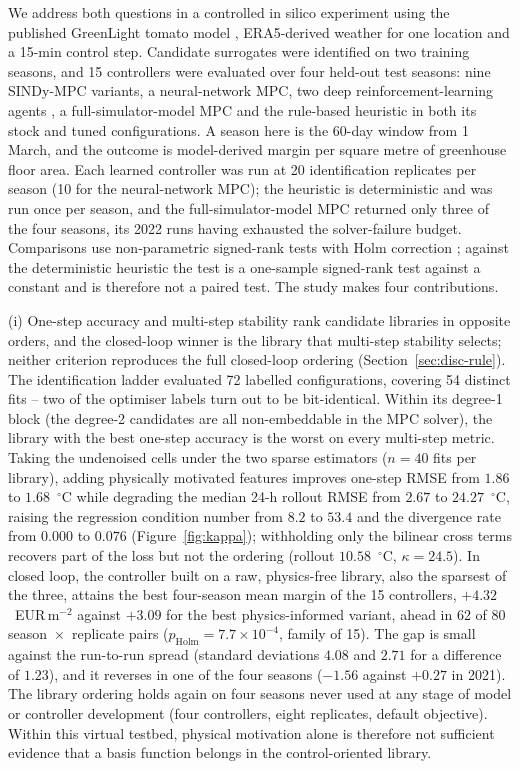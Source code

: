 We address both questions in a controlled in silico experiment using the published
GreenLight tomato model \cite{katzin2020,vanlaatum2025}, ERA5-derived weather for one
location and a 15-min control step. Candidate surrogates were identified on two training
seasons, and 15 controllers were evaluated over four held-out test seasons: nine
SINDy-MPC variants, a neural-network MPC, two deep reinforcement-learning agents
\cite{schulman2017,haarnoja2018,raffin2021}, a full-simulator-model MPC and the
rule-based heuristic in both its stock and tuned configurations. A season
here is the 60-day window from 1 March, and the outcome is model-derived margin per square
metre of greenhouse floor area. Each learned controller was run at 20 identification
replicates per season (10 for
the neural-network MPC); the heuristic is deterministic and was run once per season, and
the full-simulator-model MPC returned only three of the four seasons, its 2022 runs having
exhausted the solver-failure budget. Comparisons use non-parametric signed-rank tests with
Holm correction \cite{wilcoxon1945,holm1979,demsar2006}; against the deterministic
heuristic the test is a one-sample signed-rank test against a constant and is therefore
not a paired test. The study makes four contributions.

(i) One-step accuracy and multi-step stability rank candidate libraries in
opposite orders, and the closed-loop winner is the library that multi-step stability
selects; neither criterion reproduces the full closed-loop ordering
(Section~\ref{sec:disc-rule}). The
identification ladder evaluated 72 labelled configurations, covering 54 distinct fits --
two of the optimiser labels turn out to be bit-identical. Within its degree-1 block (the degree-2 candidates are all non-embeddable in the MPC solver), the library with the
best one-step accuracy is the worst on every multi-step metric. Taking the undenoised
cells under the two sparse estimators ($n = 40$ fits per library), adding physically
motivated features improves
one-step RMSE from $1.86$ to $1.68$~$^\circ$C while degrading the median 24-h rollout RMSE
from $2.67$ to $24.27$~$^\circ$C, raising the regression condition number from $8.2$ to
$53.4$ and the divergence rate from $0.000$ to $0.076$ (Figure~\ref{fig:kappa});
withholding only the bilinear cross terms recovers part of the loss but not the ordering
(rollout $10.58$~$^\circ$C, $\kappa = 24.5$). In closed loop, the controller built on a raw, physics-free library, also the sparsest of
the three, attains the best four-season mean margin of the 15 controllers, $+4.32$~EUR\,m$^{-2}$ against $+3.09$
for the best physics-informed variant, ahead in 62 of 80 season~$\times$~replicate pairs
($p_{\mathrm{Holm}} = 7.7 \times 10^{-4}$, family of 15). The gap is small against the
run-to-run spread (standard deviations $4.08$ and $2.71$ for a difference of $1.23$), and it reverses in one of the four seasons ($-1.56$ against $+0.27$ in 2021). The library
ordering holds again on four seasons never used at any stage of model or controller
development (four controllers, eight replicates, default objective). Within this virtual
testbed, physical motivation alone is therefore not sufficient evidence that a basis
function belongs in the control-oriented library.

